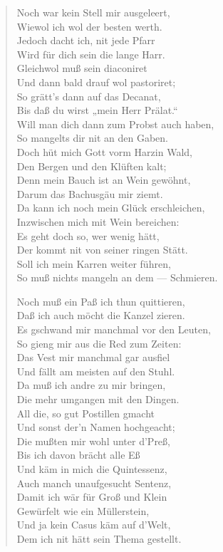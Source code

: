 \begin{verse}
Noch war kein Stell mir ausgeleert,\\
Wiewol ich wol der besten werth.\\
Jedoch dacht ich, nit jede Pfarr\\
Wird für dich sein die lange Harr.\\
Gleichwol muß sein diaconiret\\
Und dann bald drauf wol pastoriret;\\
So grätt’s dann auf das Decanat,\\
Bis daß du wirst „mein Herr Prälat.“\\
Will man dich dann zum Probst auch haben,\\
So mangelts dir nit an den Gaben.\\
Doch hüt mich Gott vorm Harzin Wald,\\
Den Bergen und den Klüften kalt;\\
Denn mein Bauch ist an Wein gewöhnt,\\
Darum das Bachusgäu mir ziemt.\\
Da kann ich noch mein Glück erschleichen,\\
Inzwischen mich mit Wein bereichen:\\
Es geht doch so, wer wenig hätt,\\
Der kommt nit von seiner ringen Stätt.\\
Soll ich mein Karren weiter führen,\\
So muß nichts mangeln an dem — Schmieren.

Noch muß ein Paß ich thun quittieren,\\
Daß ich auch möcht die Kanzel zieren.\\
Es gschwand mir manchmal vor den Leuten,\\
So gieng mir aus die Red zum Zeiten:\\
Das Vest mir manchmal gar ausfiel\\
Und fällt am meisten auf den Stuhl.\\
Da muß ich andre zu mir bringen,\\
Die mehr umgangen mit den Dingen.\\
All die, so gut Postillen gmacht\\
Und sonst der’n Namen hochgeacht;\\
Die mußten mir wohl unter d’Preß,\\
Bis ich davon brächt alle Eß\\
Und käm in mich die Quintessenz,\\
Auch manch unaufgesucht Sentenz,\\
Damit ich wär für Groß und Klein\\
Gewürfelt wie ein Müllerstein,\\
Und ja kein Casus käm auf d’Welt,\\
Dem ich nit hätt sein Thema gestellt.


\end{verse}
